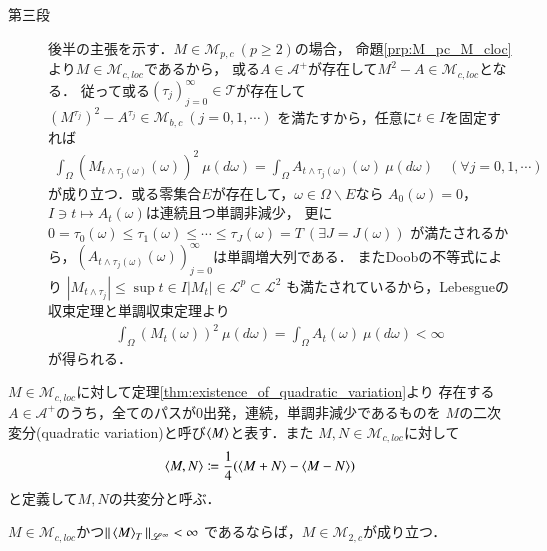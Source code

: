 \begin{prf}
\begin{description}
			\item[第三段]
				後半の主張を示す．$M \in \mathcal{M}_{p,c}\ (p \geq 2)$の場合，
				命題\ref{prp:M_pc_M_cloc}より$M \in \mathcal{M}_{c,loc}$であるから，
				或る$A \in \mathcal{A}^+$が存在して$M^2 - A \in \mathcal{M}_{c,loc}$となる．
				従って或る$(\tau_j)_{j=0}^{\infty} \in \mathcal{T}$が存在して
				$\left(M^{\tau_j} \right)^2 - A^{\tau_j} \in \mathcal{M}_{b,c}\ (j=0,1,\cdots)$
				を満たすから，任意に$t \in I$を固定すれば
				\begin{align}
					\int_{\Omega} \left( M_{t \wedge \tau_j(\omega)}(\omega) \right)^2\ \mu(d\omega)
					= \int_{\Omega} A_{t \wedge \tau_j(\omega)}(\omega)\ \mu(d\omega)
					\quad (\forall j=0,1,\cdots)
				\end{align}
				が成り立つ．或る零集合$E$が存在して，$\omega \in \Omega \backslash E$なら
				$A_0(\omega) = 0$，$I \ni t \longmapsto A_t(\omega)$は連続且つ単調非減少，
				更に$0 = \tau_0(\omega) \leq \tau_1(\omega) \leq \cdots \leq \tau_{J}(\omega) = T\ (\exists J = J(\omega))$
				が満たされるから，$\left(A_{t \wedge \tau_j(\omega)}(\omega)\right)_{j=0}^{\infty}$は単調増大列である．
				またDoobの不等式により
				$\left| M_{t \wedge \tau_j} \right| \leq \sup{t \in I}{|M_t|} \in \mathscr{L}^p \subset \mathscr{L}^2$
				も満たされているから，Lebesgueの収束定理と単調収束定理より
				\begin{align}
					\int_{\Omega} \left( M_t(\omega) \right)^2\ \mu(d\omega)
					= \int_{\Omega} A_t(\omega)\ \mu(d\omega) < \infty
				\end{align}
				が得られる．
		\end{description}
	\end{prf}
	
	\begin{screen}
		\begin{dfn}[二次変分]
			$M \in \mathcal{M}_{c,loc}$に対して定理\ref{thm:existence_of_quadratic_variation}より
			存在する$A \in \mathcal{A}^+$のうち，全てのパスが$0$出発，連続，単調非減少であるものを
			$M$の二次変分(quadratic variation)と呼び$\inprod<M>$と表す．また
			$M,N \in \mathcal{M}_{c,loc}$に対して
			\begin{align}
				\inprod<M,N> \coloneqq \frac{1}{4} (\inprod<M+N> - \inprod<M-N>)
			\end{align}
			と定義して$M,N$の共変分と呼ぶ．
		\end{dfn}
	\end{screen}

	\begin{screen}
		\begin{thm}[二次変分が有界な連続局所マルチンゲールは連続な二乗可積分マルチンゲール]
			$M \in \mathcal{M}_{c,loc}$かつ$\Norm{\inprod<M>_T}{\mathscr{L}^{\infty}} < \infty$
			であるならば，$M \in \mathcal{M}_{2,c}$が成り立つ．
			\label{thm:quadratic_variation_bounded_then_M_2c}
		\end{thm}
	\end{screen}
	
